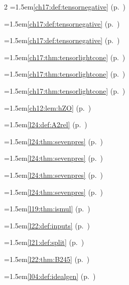 \begin{multicols}{2}
\hangindent=1.5em\quad \ref{ch17:def:tensornegative} (p.~\pageref{ch17:def:tensornegative})\par
\hangindent=1.5em\quad \ref{ch17:def:tensornegative} (p.~\pageref{ch17:def:tensornegative})\par
\hangindent=1.5em\quad \ref{ch17:def:tensornegative} (p.~\pageref{ch17:def:tensornegative})\par
\hangindent=1.5em\quad \ref{ch17:thm:tensorlightcone} (p.~\pageref{ch17:thm:tensorlightcone})\par
\hangindent=1.5em\quad \ref{ch17:thm:tensorlightcone} (p.~\pageref{ch17:thm:tensorlightcone})\par
\hangindent=1.5em\quad \ref{ch17:thm:tensorlightcone} (p.~\pageref{ch17:thm:tensorlightcone})\par
\hangindent=1.5em\quad \ref{ch12:lem:hZO} (p.~\pageref{ch12:lem:hZO})\par
\par{}\par\nopagebreak\smallskip
\hangindent=1.5em\quad \ref{l24:def:A2rel} (p.~\pageref{l24:def:A2rel})\par
\hangindent=1.5em\quad \ref{l24:thm:sevenpres} (p.~\pageref{l24:thm:sevenpres})\par
\hangindent=1.5em\quad \ref{l24:thm:sevenpres} (p.~\pageref{l24:thm:sevenpres})\par
\hangindent=1.5em\quad \ref{l24:thm:sevenpres} (p.~\pageref{l24:thm:sevenpres})\par
\hangindent=1.5em\quad \ref{l24:thm:sevenpres} (p.~\pageref{l24:thm:sevenpres})\par
\hangindent=1.5em\quad \ref{l19:thm:ismul} (p.~\pageref{l19:thm:ismul})\par
\hangindent=1.5em\quad \ref{l22:def:inputs} (p.~\pageref{l22:def:inputs})\par
\hangindent=1.5em\quad \ref{l21:def:split} (p.~\pageref{l21:def:split})\par
\hangindent=1.5em\quad \ref{l22:thm:B245} (p.~\pageref{l22:thm:B245})\par
\hangindent=1.5em\quad \ref{l04:def:idealgen} (p.~\pageref{l04:def:idealgen})\par

\end{multicols}
